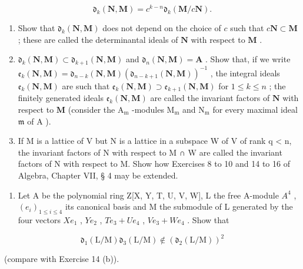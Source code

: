 \[
\mathfrak {d} _ {k} (\mathbf {N}, \mathbf {M}) = c ^ {k - n} \mathfrak {d} _ {k} (\mathbf {M} / c \mathbf {N}).
\]

\begin{enumerate}
\def\labelenumi{(\alph{enumi})}
\item
  Show that \(\mathfrak{d}_k(\mathbf{N},\mathbf{M})\) does not depend on the choice of \(c\) such that \(c\mathbf{N}\subset \mathbf{M}\) ; these are called the determinantal ideals of \(\mathbf{N}\) with respect to \(\mathbf{M}\) .
\item
  \(\mathfrak{d}_k(\mathbf{N},\mathbf{M})\subset \mathfrak{d}_{k + 1}(\mathbf{N},\mathbf{M})\) and \(\mathfrak{d}_n(\mathbf{N},\mathbf{M}) = \mathbf{A}\) . Show that, if we write \(\mathfrak{e}_k(\mathbf{N},\mathbf{M}) = \mathfrak{d}_{n - k}(\mathbf{N},\mathbf{M})(\mathfrak{d}_{n - k + 1}(\mathbf{N},\mathbf{M}))^{-1}\) , the integral ideals \(\mathfrak{e}_k(\mathbf{N},\mathbf{M})\) are such that \(\mathfrak{e}_k(\mathbf{N},\mathbf{M})\supset \mathfrak{e}_{k + 1}(\mathbf{N},\mathbf{M})\) for \(1\leqslant k\leqslant n\) ; the finitely generated ideals \(\mathfrak{e}_k(\mathbf{N},\mathbf{M})\) are called the invariant factors of \(\mathbf{N}\) with respect to \(\mathbf{M}\) (consider the \(\mathrm{A_m}\) -modules \(\mathrm{M_m}\) and \(\mathrm{N_m}\) for every maximal ideal \(\mathfrak{m}\) of \(\mathrm{A}\) ).
\item
  If M is a lattice of V but N is a lattice in a subspace W of V of rank q \textless{} n, the invariant factors of N with respect to M ∩ W are called the invariant factors of N with respect to M. Show how Exercises 8 to 10 and 14 to 16 of Algebra, Chapter VII, § 4 may be extended.
\end{enumerate}

\begin{enumerate}
\def\labelenumi{\arabic{enumi}.}
\setcounter{enumi}{14}
\tightlist
\item
  Let A be the polynomial ring Z{[}X, Y, T, U, V, W{]}, L the free A-module \(A^{4}\) , \((e_{i})_{1 \leq i \leq 4}\) its canonical basis and M the submodule of L generated by the four vectors \(Xe_{1}\) , \(Ye_{2}\) , \(Te_{3} + Ue_{4}\) , \(Ve_{3} + We_{4}\) . Show that
\end{enumerate}

\[
\mathfrak {d} _ {1} (\mathrm{L} / \mathrm{M}) \mathfrak {d} _ {3} (\mathrm{L} / \mathrm{M}) \notin (\mathfrak {d} _ {2} (\mathrm{L} / \mathrm{M})) ^ {2}
\]

(compare with Exercise 14 (b)).

